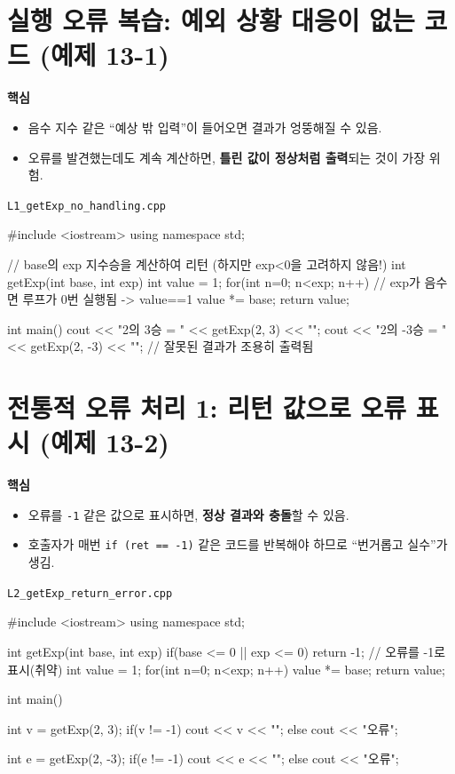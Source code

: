 \documentclass[11pt,a4paper]{article}
\newcommand{\filetag}[1]{\texttt{\color{Accent}#1}}
\begin{document}
\tableofcontents
\newpage

\section{실행 오류 복습: 예외 상황 대응이 없는 코드 (예제 13-1)}
\begin{GoalBox}
\textbf{핵심}
\begin{itemize}[leftmargin=18pt]
  \item 음수 지수 같은 ``예상 밖 입력''이 들어오면 결과가 엉뚱해질 수 있음.
  \item 오류를 발견했는데도 계속 계산하면, \textbf{틀린 값이 정상처럼 출력}되는 것이 가장 위험.
\end{itemize}
\end{GoalBox}

\noindent\filetag{L1\_getExp\_no\_handling.cpp}
\begin{cppcode}
#include <iostream>
using namespace std;

// base의 exp 지수승을 계산하여 리턴 (하지만 exp<0을 고려하지 않음!)
int getExp(int base, int exp) {
    int value = 1;
    for(int n=0; n<exp; n++) // exp가 음수면 루프가 0번 실행됨 -> value==1
        value *= base;
    return value;
}

int main() {
    cout << "2의 3승 = " << getExp(2, 3) << "\n";
    cout << "2의 -3승 = " << getExp(2, -3) << "\n"; // 잘못된 결과가 조용히 출력됨
}
\end{cppcode}

\section{전통적 오류 처리 1: 리턴 값으로 오류 표시 (예제 13-2)}
\begin{GoalBox}
\textbf{핵심}
\begin{itemize}[leftmargin=18pt]
  \item 오류를 \texttt{-1} 같은 값으로 표시하면, \textbf{정상 결과와 충돌}할 수 있음.
  \item 호출자가 매번 \texttt{if (ret == -1)} 같은 코드를 반복해야 하므로 ``번거롭고 실수''가 생김.
\end{itemize}
\end{GoalBox}

\noindent\filetag{L2\_getExp\_return\_error.cpp}
\begin{cppcode}
#include <iostream>
using namespace std;

int getExp(int base, int exp) {
    if(base <= 0 || exp <= 0) return -1; // 오류를 -1로 표시(취약)
    int value = 1;
    for(int n=0; n<exp; n++) value *= base;
    return value;
}

int main() {
    int v = getExp(2, 3);
    if(v != -1) cout << v << "\n";
    else        cout << "오류\n";

    int e = getExp(2, -3);
    if(e != -1) cout << e << "\n";
    else        cout << "오류\n";
}
\end{cppcode}
\end{document}
